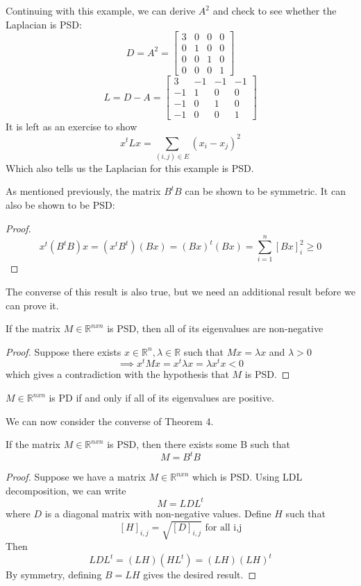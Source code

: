 \documentclass{article}
\begin{document}
    Continuing with this example, we can derive $A^2$ and check to see whether the Laplacian is PSD:
    $$D = A^2 = \begin{bmatrix}
                    3 & 0 & 0 & 0 \\
                    0 & 1 & 0 & 0 \\
                    0 & 0 & 1 & 0 \\
                    0 & 0 & 0 & 1 
                \end{bmatrix}$$
    $$L = D - A = \begin{bmatrix}
                    3 & -1 & -1 & -1 \\
                    -1 & 1 & 0 & 0 \\
                    -1 & 0 & 1 & 0 \\
                    -1 & 0 & 0 & 1 
                    \end{bmatrix}$$
    It is left as an exercise to show
    $$x^{t}Lx = \sum_{(i,j)\in E}(x_i - x_j)^2$$
    Which also tells us the Laplacian for this example is PSD.
    
    As mentioned previously, the matrix $B^{t}B$ can be shown to be symmetric. It can also be shown to be PSD:
    \begin{proof}
      $$x^{t}(B^{t}B)x = (x^{t}B^{t})(Bx) = (Bx)^{t}(Bx) = \sum_{i=1}^{n} [Bx]_{i}^{2} \geq 0$$
    \end{proof}
    
    The converse of this result is also true, but we need an additional result before we can prove it.
    \begin{theorem}
        If the matrix $M\in \mathbb{R}^{nxn}$ is PSD, then all of its eigenvalues are non-negative
    \end{theorem}
    \begin{proof}
        Suppose there exists $x\in \mathbb{R}^{n}, \lambda \in \mathbb{R}$ such that $Mx=\lambda x$ and $\lambda > 0$
        $$\implies x^{t}Mx = x^{t}\lambda x = \lambda x^{t}x < 0$$
        which gives a contradiction with the hypothesis that $M$ is PSD.
    \end{proof}
    
    \begin{corollary}
        $M\in \mathbb{R}^{nxn}$ is PD if and only if all of its eigenvalues are positive.
    \end{corollary}
    
    We can now consider the converse of Theorem 4.
    \begin{theorem}
        If the matrix $M \in \mathbb{R}^{nxn}$ is PSD, then there exists some B such that 
        $$M = B^{t}B$$
    \end{theorem}
    \begin{proof}
        Suppose we have a matrix $M\in \mathbb{R}^{nxn}$ which is PSD. Using LDL decomposition, we can write
        $$M = LDL^{t}$$
        where $D$ is a diagonal matrix with non-negative values. Define $H$ such that
        $$[H]_{i,j} = \sqrt{[D]_{i,j}} \text{ for all i,j}$$
        Then
        $$LDL^{t} = (LH)(HL^{t}) = (LH)(LH)^{t}$$
        By symmetry, defining $B = LH$ gives the desired result.
    \end{proof}
    
\end{document}
